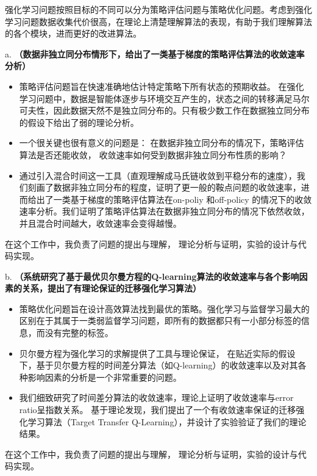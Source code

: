 \documentclass{resume}
\begin{document}
强化学习问题按照目标的不同可以分为策略评估问题与策略优化问题。考虑到强化学习问题数据收集代价很高，在理论上清楚理解算法的表现，有助于我们理解算法的各个模块，进而更好的改进算法。

a. \textbf{（数据非独立同分布情形下，给出了一类基于梯度的策略评估算法的收敛速率分析）}  
\begin{itemize}
  \item 策略评估问题旨在快速准确地估计特定策略下所有状态的预期收益。 在强化学习问题中，数据是智能体逐步与环境交互产生的，状态之间的转移满足马尔可夫性，因此数据天然不是独立同分布的。只有极少数工作在数据独立同分布的假设下给出了弱的理论分析。  

  \item  一个很关键也很有意义的问题是： 在数据非独立同分布的情况下，策略评估算法是否还能收敛， 收敛速率如何受到数据非独立同分布性质的影响？
  
  \item 通过引入混合时间这一工具（直观理解成马氏链收敛到平稳分布的速度），我们刻画了数据非独立同分布的程度，证明了更一般的鞍点问题的收敛速率，进而给出了一类基于梯度的策略评估算法在on-poliy 和off-policy 的情况下的收敛速率分析。我们证明了策略评估算法在数据非独立同分布的情况下依然收敛，并且混合时间越大，收敛速率会变得越慢。
\end{itemize}


\faHandORight 在这个工作中，我负责了问题的提出与理解， 理论分析与证明，实验的设计与代码实现。

b. \textbf{（系统研究了基于最优贝尔曼方程的Q-learning算法的收敛速率与各个影响因素的关系，提出了有理论保证的迁移强化学习算法）} 
\begin{itemize}
  \item 策略优化问题旨在设计高效算法找到最优的策略。强化学习与监督学习最大的区别在于其属于一类弱监督学习问题，即所有的数据都只有一小部分标签的信息，而没有完整的标签。
  \item 贝尔曼方程为强化学习的求解提供了工具与理论保证， 在贴近实际的假设下，基于贝尔曼方程的时间差分算法（如Q-learning）的收敛速率以及对其各种影响因素的分析是一个非常重要的问题。
  \item 我们细致研究了时间差分算法的收敛速率，理论上证明了收敛速率与error ratio呈指数关系。 基于理论发现，我们提出了一个有收敛速率保证的迁移强化学习算法（Target Transfer Q-Learning），并设计了实验验证了我们的理论结果。
\end{itemize}

\faHandORight 在这个工作中，我负责了问题的提出与理解， 理论分析与证明，实验的设计与代码实现。
\end{document}
